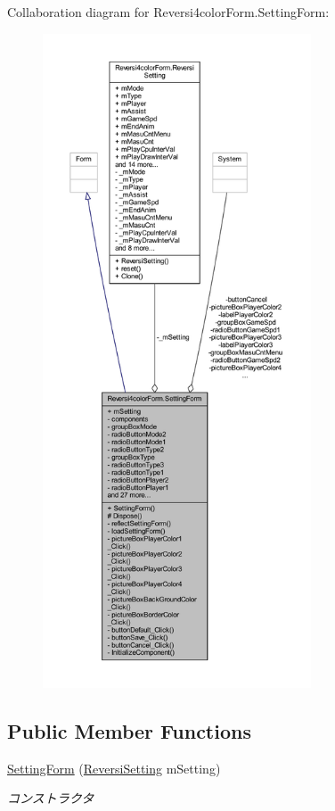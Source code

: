 Collaboration diagram for Reversi4color\+Form.\+Setting\+Form\+:
\nopagebreak
\begin{figure}[H]
\begin{center}
\leavevmode
\includegraphics[height=550pt]{class_reversi4color_form_1_1_setting_form__coll__graph}
\end{center}
\end{figure}
\subsection*{Public Member Functions}
\begin{DoxyCompactItemize}
\item 
\hyperlink{class_reversi4color_form_1_1_setting_form_abad707f432da3b5a135419320dbf331d}{Setting\+Form} (\hyperlink{class_reversi4color_form_1_1_reversi_setting}{Reversi\+Setting} m\+Setting)
\begin{DoxyCompactList}\small\item\em コンストラクタ \end{DoxyCompactList}\end{DoxyCompactItemize}
